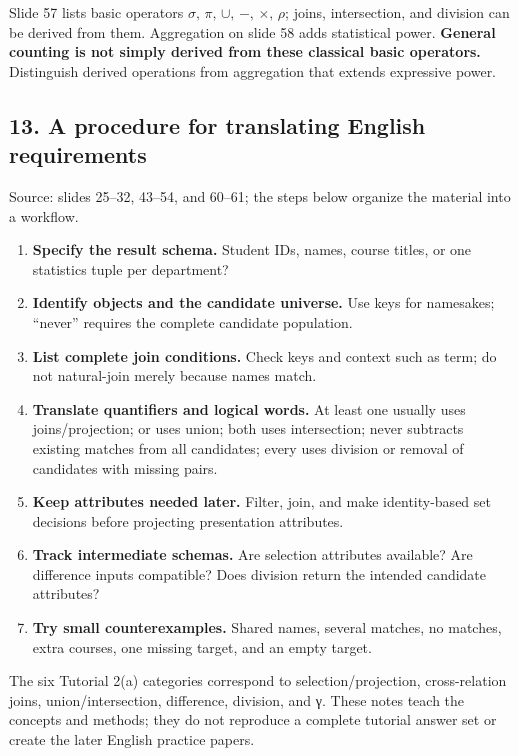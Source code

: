 Slide 57 lists basic operators \(\sigma ,\,\pi ,\,\cup ,\,- ,\,\times ,\,\rho \); joins, intersection, and division can be derived from them. Aggregation on slide 58 adds statistical power. \textbf{General counting is not simply derived from these classical basic operators.} Distinguish derived operations from aggregation that extends expressive power.

\subsection{13. A procedure for translating English requirements}\label{05_relational_algebra_en-a-procedure-for-translating-english-requirements}

Source: slides 25--32, 43--54, and 60--61; the steps below organize the material into a workflow.

\begin{enumerate}
\def\labelenumi{\arabic{enumi}.}
\tightlist
\item
  \textbf{Specify the result schema.} Student IDs, names, course titles, or one statistics tuple per department?
\item
  \textbf{Identify objects and the candidate universe.} Use keys for namesakes; ``never'' requires the complete candidate population.
\item
  \textbf{List complete join conditions.} Check keys and context such as term; do not natural-join merely because names match.
\item
  \textbf{Translate quantifiers and logical words.} At least one usually uses joins/projection; or uses union; both uses intersection; never subtracts existing matches from all candidates; every uses division or removal of candidates with missing pairs.
\item
  \textbf{Keep attributes needed later.} Filter, join, and make identity-based set decisions before projecting presentation attributes.
\item
  \textbf{Track intermediate schemas.} Are selection attributes available? Are difference inputs compatible? Does division return the intended candidate attributes?
\item
  \textbf{Try small counterexamples.} Shared names, several matches, no matches, extra courses, one missing target, and an empty target.
\end{enumerate}

The six Tutorial 2(a) categories correspond to selection/projection, cross-relation joins, union/intersection, difference, division, and γ. These notes teach the concepts and methods; they do not reproduce a complete tutorial answer set or create the later English practice papers.

